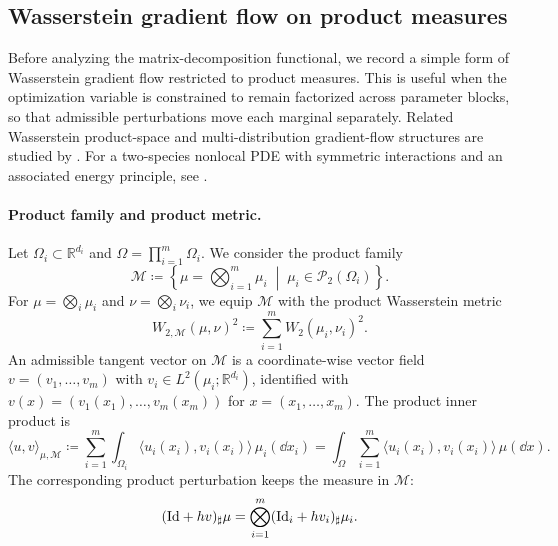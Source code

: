 \subsection{Wasserstein gradient flow on product measures}
\label{app:product-measure-wgf}

Before analyzing the matrix-decomposition functional, we record a simple form of
Wasserstein gradient flow restricted to product measures.  This is useful when the
optimization variable is constrained to remain factorized across parameter blocks,
so that admissible perturbations move each marginal separately.
Related Wasserstein product-space and multi-distribution gradient-flow
structures are studied by
\citet{chen2016wassersteinProduct,conger2025coupled}.
For a two-species nonlocal PDE with symmetric interactions and an associated
energy principle, see \citet{giunta2024weaklynonlinear}.

\paragraph{Product family and product metric.}
Let $\Omega_i\subset\mathbb R^{d_i}$ and $\Omega=\prod_{i=1}^m\Omega_i$.  We consider the
product family
\begin{equation}
    \mathcal M
    \coloneqq
    \left\{
        \mu=\bigotimes_{i=1}^m\mu_i
        \;\middle|\;
        \mu_i\in\mathcal P_2(\Omega_i)
    \right\}.
\end{equation}
For $\mu=\bigotimes_i\mu_i$ and $\nu=\bigotimes_i\nu_i$, we equip $\mathcal M$ with the
product Wasserstein metric
\begin{equation}
    \label{eq:product-Wasserstein-metric}
    W_{2,\mathcal M}(\mu,\nu)^2
    \coloneqq
    \sum_{i=1}^m W_2(\mu_i,\nu_i)^2 .
\end{equation}
An admissible tangent vector on $\mathcal M$ is a coordinate-wise vector field
$v=(v_1,\ldots,v_m)$ with $v_i\in L^2(\mu_i;\mathbb R^{d_i})$, identified with
$v(x)=(v_1(x_1),\ldots,v_m(x_m))$ for $x=(x_1,\ldots,x_m)$.  The product inner product is
\begin{equation}
    \langle u,v\rangle_{\mu,\mathcal M}
    \coloneqq
    \sum_{i=1}^m \int_{\Omega_i} \langle u_i(x_i),v_i(x_i)\rangle\,\mu_i(\dd x_i)
    =
    \int_{\Omega}\sum_{i=1}^m \langle u_i(x_i),v_i(x_i)\rangle\,\mu(\dd x).
\end{equation}
The corresponding product perturbation keeps the measure in $\mathcal M$:
\begin{equation}
    (\mathrm{Id}+h v)_\sharp\mu
    =
    \bigotimes_{i=1}^m (\mathrm{Id}_i+h v_i)_\sharp\mu_i .
\end{equation}

